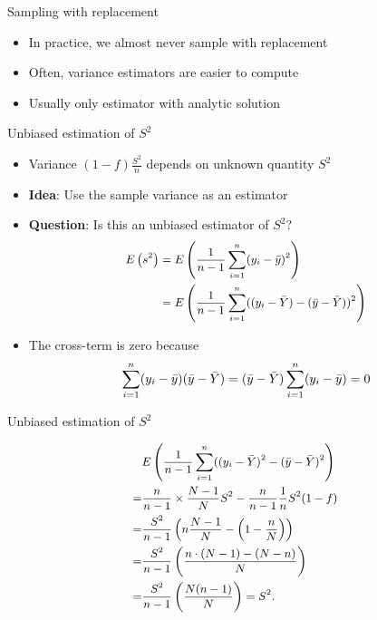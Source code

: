 \documentclass[
  ignorenonframetext,
]{beamer}
\providecommand{\tightlist}{%
  \setlength{\itemsep}{0pt}\setlength{\parskip}{0pt}}
\begin{document}
\begin{frame}{Sampling with replacement}
\protect\hypertarget{sampling-with-replacement}{}

\begin{itemize}
\tightlist
\item
  In practice, we almost never sample with replacement
\item
  Often, variance estimators are easier to compute
\item
  Usually only estimator with analytic solution
\end{itemize}

\end{frame}

\begin{frame}{Unbiased estimation of \(S^2\)}
\protect\hypertarget{unbiased-estimation-of-s2}{}

\begin{itemize}
\tightlist
\item
  Variance \((1-f) \frac{S^2}{n}\) depends on unknown quantity \(S^2\)
\item
  \textbf{Idea}: Use the sample variance as an estimator
\item
  \textbf{Question}: Is this an unbiased estimator of \(S^2\)? \[ \small
  \begin{aligned}
  E \left( s^2 \right) &= E \left( \frac{1}{n-1} \sum_{i=1}^n (y_i - \bar y)^2 \right) \\
  &= E \left( \frac{1}{n-1} \sum_{i=1}^n ( (y_i - \bar Y) - (\bar y - \bar Y))^2 \right) \\
  \end{aligned}
  \]
\item
  The cross-term is zero because \[ \small
  \sum_{i=1}^n (y_i - \bar y) (\bar y - \bar Y) =  (\bar y - \bar Y) \sum_{i=1}^n (y_i - \bar y) = 0
  \]
\end{itemize}

\end{frame}

\begin{frame}{Unbiased estimation of \(S^2\)}
\protect\hypertarget{unbiased-estimation-of-s2-1}{}

\[ \small
\begin{aligned}
&E \left( \frac{1}{n-1} \sum_{i=1}^n ( (y_i - \bar Y)^2 - (\bar y - \bar Y)^2 \right) \\
=& \frac{n}{n-1} \times \frac{N-1}{N} S^2 - \frac{n}{n-1} \frac{1}{n} S^2 (1-f) \\
=& \frac{S^2}{n-1} \left( n \frac{N-1}{N} - \left(1-\frac{n}{N} \right) \right) \\
=& \frac{S^2}{n-1} \left( \frac{n \cdot(N-1)-(N-n)}{N} \right) \\
=& \frac{S^2}{n-1} \left( \frac{N(n-1)}{N} \right) = S^2.
\end{aligned}
\]

\end{frame}
\end{document}
